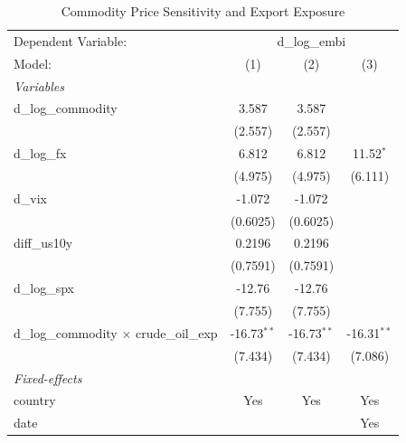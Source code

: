 
\begin{table}[htbp]
   \caption{\label{tab:main_results} Commodity Price Sensitivity and Export Exposure}
   \centering
   \begin{tabular}{lccc}
      \tabularnewline \midrule \midrule
      Dependent Variable: & \multicolumn{3}{c}{d\_log\_embi}\\
      Model:                                          & (1)           & (2)           & (3)\\  
      \midrule
      \emph{Variables}\\
      d\_log\_commodity                               & 3.587         & 3.587         &   \\   
                                                      & (2.557)       & (2.557)       &   \\   
      d\_log\_fx                                      & 6.812         & 6.812         & 11.52$^{*}$\\   
                                                      & (4.975)       & (4.975)       & (6.111)\\   
      d\_vix                                          & -1.072        & -1.072        &   \\   
                                                      & (0.6025)      & (0.6025)      &   \\   
      diff\_us10y                                     & 0.2196        & 0.2196        &   \\   
                                                      & (0.7591)      & (0.7591)      &   \\   
      d\_log\_spx                                     & -12.76        & -12.76        &   \\   
                                                      & (7.755)       & (7.755)       &   \\   
      d\_log\_commodity $\times$ crude\_oil\_exp      & -16.73$^{**}$ & -16.73$^{**}$ & -16.31$^{**}$\\   
                                                      & (7.434)       & (7.434)       & (7.086)\\   
      \midrule
      \emph{Fixed-effects}\\
      country                                         & Yes           & Yes           & Yes\\  
      date                                            &               &               & Yes\\  

\end{tabular}
\end{table}
